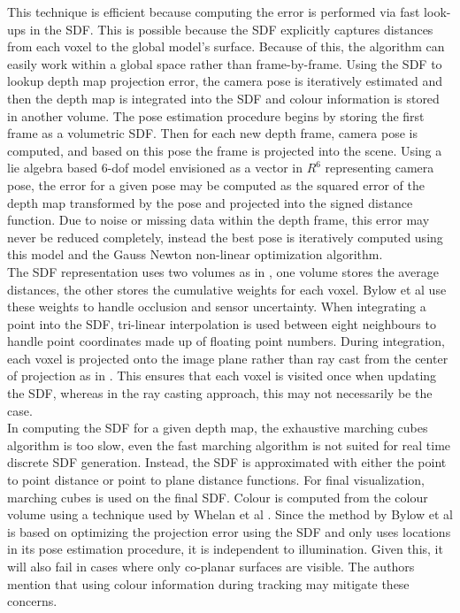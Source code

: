 This technique is efficient because computing the error is performed via fast look-ups in the SDF. This is possible because the SDF explicitly captures distances from each voxel to the global model's surface. Because of this, the algorithm can easily work within a global space rather than frame-by-frame. Using the SDF to lookup depth map projection error, the camera pose is iteratively estimated and then the depth map is integrated into the SDF and colour information is stored in another volume. The pose estimation procedure begins by storing the first frame as a volumetric SDF. Then for each new depth frame, camera pose is computed, and based on this pose the frame is projected into the scene. Using a lie algebra based 6-dof model \cite{Ma12Invitation} envisioned as a vector in $R^6$ representing camera pose, the error for a given pose may be computed as the squared error of the depth map transformed by the pose and projected into the signed distance function. Due to noise or missing data within the depth frame, this error may never be reduced completely, instead the best pose is iteratively computed using this model and the Gauss Newton non-linear optimization algorithm. \\

The SDF representation uses two volumes as in \cite{Curless96Volumetric}, one volume stores the average distances, the other stores the cumulative weights for each voxel. Bylow et al use these weights to handle occlusion and sensor uncertainty. When integrating a point into the SDF, tri-linear interpolation is used between eight neighbours to handle point coordinates made up of floating point numbers. During integration, each voxel is projected onto the image plane rather than ray cast from the center of projection as in \cite{Newcombe11Kinectfusion}. This ensures that each voxel is visited once when updating the SDF, whereas in the ray casting approach, this may not necessarily be the case. \\

In computing the SDF for a given depth map, the exhaustive marching cubes algorithm is too slow, even the fast marching algorithm \cite{Baerentzen01Implementation} is not suited for real time discrete SDF generation. Instead, the SDF is approximated with either the point to point distance or point to plane distance functions. For final visualization, marching cubes is used \cite{Lorensen87Marching} on the final SDF. Colour is computed from the colour volume using a technique used by Whelan et al \cite{Whelan13Robust}. Since the method by Bylow et al is based on optimizing the projection error using the SDF and only uses locations in its pose estimation procedure, it is independent to illumination. Given this, it will also fail in cases where only co-planar surfaces are visible. The authors mention that using colour information during tracking \cite{Kerl13Robust} may mitigate these concerns.

